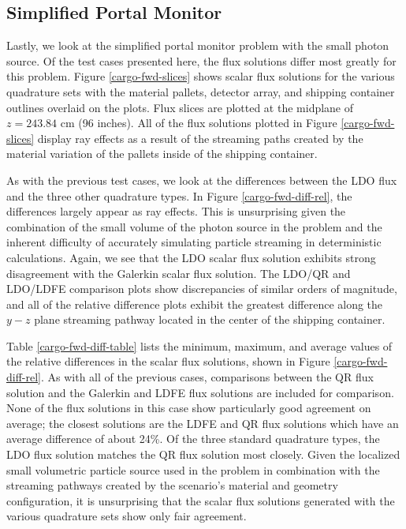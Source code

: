 \documentclass{article} %
\begin{document}
\FloatBarrier
\subsection{Simplified Portal Monitor}

Lastly, we look at the simplified portal monitor problem with the small photon
source. Of the test cases presented here, the flux solutions differ most
greatly for this problem. Figure \ref{cargo-fwd-slices} shows scalar flux
solutions for the various quadrature sets with the material pallets,
detector array, and shipping container outlines overlaid on the plots. Flux
slices are plotted at the midplane of $z = 243.84$ cm (96 inches). All of the
flux solutions plotted in Figure \ref{cargo-fwd-slices} display ray effects
as a result of the streaming paths created by the material variation of the
pallets inside of the shipping container.

As with the previous test cases, we look at the differences between the 
LDO flux and the three other quadrature types. In Figure
\ref{cargo-fwd-diff-rel}, the differences largely appear as ray effects. This
is unsurprising given the combination of the small volume of the photon 
source in the problem and the inherent difficulty of accurately simulating
particle streaming in deterministic calculations. Again, we see that the LDO
scalar flux solution exhibits strong disagreement with the Galerkin scalar
flux solution. The LDO/QR and LDO/LDFE comparison plots show discrepancies of
similar orders of magnitude, and all of the relative difference plots exhibit
the greatest difference along the $y-z$ plane streaming pathway located in the
center of the shipping container.

Table \ref{cargo-fwd-diff-table} lists the minimum, maximum, and average
values of the relative differences in the scalar flux solutions, shown in
Figure \ref{cargo-fwd-diff-rel}. As with all of the previous cases,
comparisons between the QR flux solution and the Galerkin and LDFE flux
solutions are included for comparison. None of the flux solutions in this case
show particularly good agreement on average; the closest solutions are the
LDFE and QR flux solutions which have an average difference of about 24\%. Of
the three standard quadrature types, the LDO flux solution matches the QR flux
solution most closely. Given the localized small volumetric particle source
used in the problem in  combination with the streaming pathways created by the
scenario's material and geometry configuration, it is unsurprising that the
scalar flux solutions generated with the various quadrature sets show only
fair agreement.
\end{document}
